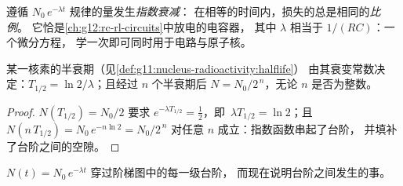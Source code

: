 \begin{definition}[指数衰减]\label{def:g12:radioactive-decay:exponential}
遵循 $N_0\,e^{-\lambda t}$ 规律的量发生\emph{指数衰减}：
在相等的时间内，损失的总是相同的\emph{比例}。
它恰是\cref{ch:g12:rc-rl-circuits}中放电的电容器，
其中 $\lambda$ 相当于 $1/(RC)$：一个微分方程，
学一次即可同时用于电路与原子核。
\end{definition}

\begin{proposition}[半衰期]\label{prop:g12:radioactive-decay:halflife}
某一核素的半衰期（见\cref{def:g11:nucleus-radioactivity:halflife}）
由其衰变常数决定：$T_{1/2} = \ln 2/\lambda$；且经过 $n$
个半衰期后 $N = N_0/2^{\,n}$，无论 $n$ 是否为整数。
\end{proposition}

\begin{proof}
$N(T_{1/2}) = N_0/2$ 要求 $e^{-\lambda T_{1/2}} = \tfrac12$，即\
$\lambda T_{1/2} = \ln 2$；且 $N(n\,T_{1/2}) = N_0\,e^{-n\ln 2} =
N_0/2^{\,n}$ 对任意 $n$ 成立：指数函数串起了台阶，
并填补了台阶之间的空隙。
\end{proof}

\begin{omfigure}

{\small $N(t) = N_0\,e^{-\lambda t}$ 穿过阶梯图中的每一级台阶，
而现在说明台阶之间发生的事。}
\end{omfigure}

